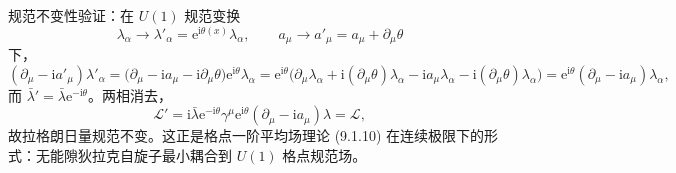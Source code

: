 规范不变性验证：在 $U(1)$ 规范变换
\begin{equation*}
\lambda_\alpha\to\lambda'_\alpha=\mathrm{e}^{\mathrm{i}\theta(x)}\lambda_\alpha,\qquad
a_\mu\to a'_\mu=a_\mu+\partial_\mu\theta
\end{equation*}
下，
\begin{equation*}
(\partial_\mu-\mathrm{i}a'_\mu)\lambda'_\alpha
=\big(\partial_\mu-\mathrm{i}a_\mu-\mathrm{i}\partial_\mu\theta\big)\mathrm{e}^{\mathrm{i}\theta}\lambda_\alpha
=\mathrm{e}^{\mathrm{i}\theta}\big(\partial_\mu\lambda_\alpha+\mathrm{i}(\partial_\mu\theta)\lambda_\alpha-\mathrm{i}a_\mu\lambda_\alpha-\mathrm{i}(\partial_\mu\theta)\lambda_\alpha\big)
=\mathrm{e}^{\mathrm{i}\theta}(\partial_\mu-\mathrm{i}a_\mu)\lambda_\alpha ,
\end{equation*}
而 $\bar{\lambda}'=\bar{\lambda}\mathrm{e}^{-\mathrm{i}\theta}$。两相消去，
\begin{equation*}
\mathcal{L}'=\mathrm{i}\bar{\lambda}\mathrm{e}^{-\mathrm{i}\theta}\gamma^\mu\mathrm{e}^{\mathrm{i}\theta}(\partial_\mu-\mathrm{i}a_\mu)\lambda=\mathcal{L} ,
\end{equation*}
故拉格朗日量规范不变。这正是格点一阶平均场理论 (9.1.10) 在连续极限下的形式：无能隙狄拉克自旋子最小耦合到 $U(1)$ 格点规范场。


